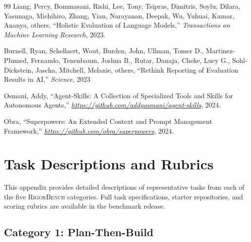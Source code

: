\documentclass[letterpaper, 10 pt, conference]{ieeeconf}
\newcommand{\bench}{\textsc{RigorBench}}
\begin{document}
\begin{thebibliography}{99}
Liang, Percy, Bommasani, Rishi, Lee, Tony, Tsipras, Dimitris, Soylu, Dilara, Yasunaga, Michihiro, Zhang, Yian, Narayanan, Deepak, Wu, Yuhuai, Kumar, Ananya, others, ``Holistic Evaluation of Language Models,'' \emph{Transactions on Machine Learning Research}, 2023.

Burnell, Ryan, Schellaert, Wout, Burden, John, Ullman, Tomer D., Martinez-Plumed, Fernando, Tenenbaum, Joshua B., Rutar, Danaja, Cheke, Lucy G., Sohl-Dickstein, Jascha, Mitchell, Melanie, others, ``Rethink Reporting of Evaluation Results in {AI},'' \emph{Science}, {2023}

Osmani, Addy, ``Agent-Skills: A Collection of Specialized Tools and Skills for Autonomous Agents,'' \emph{\url{https://github.com/addyosmani/agent-skills}}, 2024.

Obra, ``Superpowers: An Extended Context and Prompt Management Framework,'' \emph{\url{https://github.com/obra/superpowers}}, 2024.

\end{thebibliography}

\newpage
\appendix

\section{Task Descriptions and Rubrics}
\label{app:tasks}

This appendix provides detailed descriptions of representative tasks from each of the five \bench{} categories.
Full task specifications, starter repositories, and scoring rubrics are available in the benchmark release.

\subsection{Category 1: Plan-Then-Build}
\end{document}
